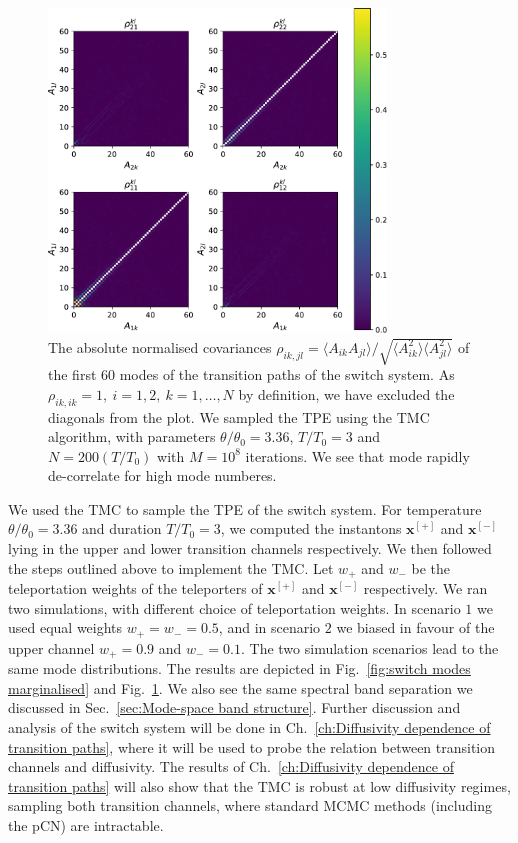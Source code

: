\begin{figure}[t]
\includegraphics[width=0.8\textwidth]{figs_part1/mcmc/switch_covariance_no_diagonal}
\centering \caption{The absolute normalised covariances $\rho_{ik,jl} = \langle A_{ik} A_{jl} \rangle / \sqrt{ \langle A_{ik}^2 \rangle \langle A_{jl}^2 \rangle }$ of the first $60$ modes of the transition paths of the switch system. As $\rho_{ik,ik} = 1,\ i=1,2,\ k=1,\dots,N$ by definition, we have excluded the diagonals from the plot. We sampled the TPE using the TMC algorithm, with parameters $\theta/\theta_{0}=3.36$, $T/T_{0}=3$ and $N=200(T/T_{0})$ with $M=10^8$ iterations. We see that mode rapidly de-correlate for high mode numberes.}
\label{fig:switch modes covariance} 
\end{figure}

We used the TMC to sample the TPE of the switch system. For temperature $\theta/ \theta_0 = 3.36$ and duration $T/T_0 = 3$, we computed the instantons $\mathbf{x}^{[+]}$ and $\mathbf{x}^{[-]}$ lying in the upper and lower transition channels respectively. We then followed the steps outlined above to implement the TMC. Let $w_+$ and $w_-$ be the teleportation weights of the teleporters of $\mathbf{x}^{[+]}$ and $\mathbf{x}^{[-]}$ respectively. We ran two simulations, with different choice of teleportation weights. In scenario $1$ we used equal weights $w_+ = w_- = 0.5$, and in scenario $2$ we biased in favour of the upper channel $w_+ = 0.9$ and $w_- = 0.1$. The two simulation scenarios lead to the same mode distributions. The results are depicted in Fig.~\ref{fig:switch modes marginalised} and Fig.~\ref{fig:switch modes covariance}. We also see the same spectral band separation we discussed in Sec.~\ref{sec:Mode-space band structure}. Further discussion and analysis of the switch system will be done in Ch.~\ref{ch:Diffusivity dependence of transition paths}, where it will be used to probe the relation between transition channels and diffusivity. The results of Ch.~\ref{ch:Diffusivity dependence of transition paths} will also show that the TMC is robust at low diffusivity regimes, sampling both transition channels, where standard MCMC methods (including the pCN) are intractable.

